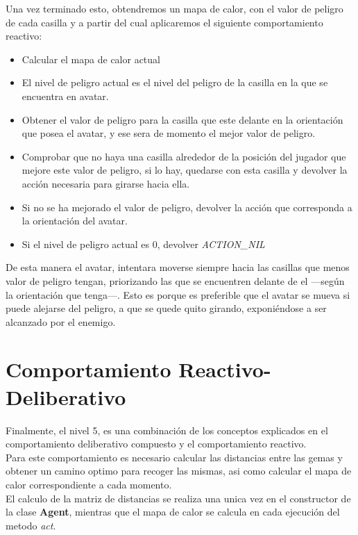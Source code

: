 Una vez terminado esto, obtendremos un mapa de calor, con el valor de peligro de cada casilla y a partir del cual aplicaremos el siguiente comportamiento reactivo:
\begin{itemize}
   \item Calcular el mapa de calor actual
   \item El nivel de peligro actual es el nivel del peligro de la casilla en la que se encuentra en avatar.
   \item Obtener el valor de peligro para la casilla que este delante en la orientación que posea el avatar, y ese sera de momento el mejor valor de peligro.
   \item Comprobar que no haya una casilla alrededor de la posición del jugador que mejore este valor de peligro, si lo hay, quedarse con esta casilla y devolver la acción necesaria para girarse hacia ella.
   \item Si no se ha mejorado el valor de peligro, devolver la acción que corresponda a la orientación del avatar.
   \item Si el nivel de peligro actual es 0, devolver \emph{ACTION\_NIL}
\end{itemize}

De esta manera el avatar, intentara moverse siempre hacia las casillas que menos valor de peligro tengan, priorizando las que se encuentren delante de el ---según la orientación que tenga---. Esto es porque es preferible que el avatar se mueva si puede alejarse del peligro, a que se quede quito girando, exponiéndose a ser alcanzado por el enemigo.

\newpage
\chapter{Comportamiento Reactivo-Deliberativo}

Finalmente, el nivel 5, es una combinación de los conceptos explicados en el comportamiento deliberativo compuesto y el comportamiento reactivo.\\

Para este comportamiento es necesario calcular las distancias entre las gemas y obtener un camino optimo para recoger las mismas, asi como calcular el mapa de calor correspondiente a cada momento.\\

El calculo de la matriz de distancias se realiza una unica vez en el constructor de la clase \textbf{Agent}, mientras que el mapa de calor se calcula en cada ejecución del metodo \emph{act}.\\

